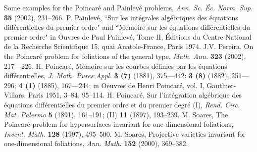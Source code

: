 \documentclass{amsart} %
\theoremstyle{definition}
\begin{document}
\begin{thebibliography}{99}
   Some examples for the Poincar\'e and Painlev\'e problems,
   {\it Ann. Sc. \'Ec. Norm. Sup.} {\bf 35} (2002), 231--266.
 P. Painlev\'e,
   ``Sur les int\'egrales alg\'ebriques des \'equations diff\'erentielles du premier ordre" and
   ``M\'emoire sur les \'equations diff\'erentielles du premier ordre" in
   Ouvres de Paul Painlev\'e, Tome II, \'Editions du Centre National de la
   Recherche Scientifique 15, quai Anatole-France, Paris 1974.
 J.V. Pereira,
   On the Poincar\'e problem for foliations of the general type,
   {\it Math. Ann.} {\bf 323} (2002), 217---226.
 H. Poincar\'e,
   M\'emoire sur les courbes d\'efinies par les \'equations diff\'erentielles,
   {\em J. Math. Pures Appl.}  {\bf 3 (7)} (1881), 375---442;
   {\bf 3 (8)} (1882), 251---296; {\bf 4 (1)}  (1885), 167---244; in
   Oeuvres de Henri Poincar\'e, vol. I, Gauthier-Villars, Paris 1951, 3--84, 95--114.
 H. Poincar\'e,
   Sur l'int\'egration alg\'ebrique des \'equations diff\'erentielles du premier ordre et
   du premier degr\'e (I),
   {\it Rend.  Circ. Mat. Palermo} {\bf 5} (1891), 161--191; (II) {\bf 11} (1897), 193--239.
 M. Soares,
   The Poincar\'e problem for hypersurfaces invariant for one-dimensional foliations,
   {\it Invent. Math. } {\bf 128} (1997), 495--500.
 M. Soares,
   Projective varieties invariant for one-dimensional foliations,
   {\it Ann. Math. } {\bf 152} (2000), 369--382.
%
%
%
%
%
%
%
%


\end{thebibliography}
\end{document}
